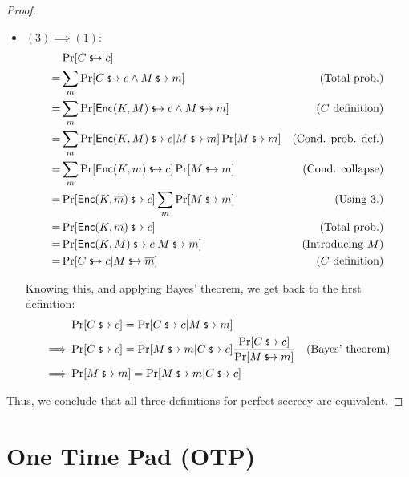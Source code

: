 \begin{proof}
\begin{itemize}
        \item $(3) \implies (1)$:
        \begin{align*}
            & \Pr[C \evaluatesto c] & \\
            =& \sum_{m}\Pr[C \evaluatesto c \wedge M \evaluatesto m] & \text{(Total prob.)} \\
            =& \sum_{m}\Pr[\textsf{Enc}(K, M) \evaluatesto c \wedge M \evaluatesto m] & \text{($C$ definition)} \\
            =& \sum_{m}\Pr[\textsf{Enc}(K, M) \evaluatesto c|M \evaluatesto m]\Pr[M \evaluatesto m] & \text{(Cond. prob. def.)} \\
            =& \sum_{m}\Pr[\textsf{Enc}(K, m) \evaluatesto c]\Pr[M \evaluatesto m] & \text{(Cond. collapse)} \\
            =& \Pr[\textsf{Enc}(K, \overline{m}) \evaluatesto c] \sum_{m}\Pr[M \evaluatesto m] & \text{(Using 3.)} \\ %
            =& \Pr[\textsf{Enc}(K, \overline{m}) \evaluatesto c] & \text{(Total prob.)} \\
            =& \Pr[\textsf{Enc}(K, M) \evaluatesto c|M \evaluatesto \overline{m}] & \text{(Introducing $M$)} \\
            =& \Pr[C \evaluatesto c|M \evaluatesto \overline{m}] & \text{($C$ definition)}
        \end{align*}

        Knowing this, and applying Bayes' theorem, we get back to the first definition:
        \begin{align*}
            & \Pr[C \evaluatesto c] = \Pr[C \evaluatesto c|M \evaluatesto m] & \\
            \implies& \Pr[C \evaluatesto c] = \Pr[M \evaluatesto m|C \evaluatesto c]\frac{\Pr[C \evaluatesto c]}{\Pr[M \evaluatesto m]} & \text{(Bayes' theorem)} \\
            \implies& \Pr[M \evaluatesto m] = \Pr[M \evaluatesto m|C \evaluatesto c] &
        \end{align*}

    \end{itemize}

    Thus, we conclude that all three definitions for perfect secrecy are equivalent.

\end{proof}

\section{One Time Pad (OTP)}

